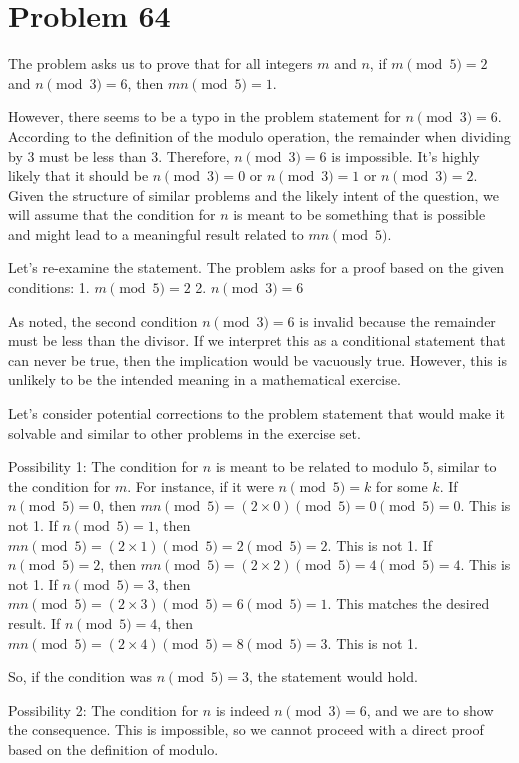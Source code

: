 \documentclass{article}
\begin{document}
\newpage

\section*{Problem 64}
The problem asks us to prove that for all integers $m$ and $n$, if $m \pmod 5 = 2$ and $n \pmod 3 = 6$, then $mn \pmod 5 = 1$.

However, there seems to be a typo in the problem statement for $n \pmod 3 = 6$. According to the definition of the modulo operation, the remainder when dividing by 3 must be less than 3. Therefore, $n \pmod 3 = 6$ is impossible. It's highly likely that it should be $n \pmod 3 = 0$ or $n \pmod 3 = 1$ or $n \pmod 3 = 2$. Given the structure of similar problems and the likely intent of the question, we will assume that the condition for $n$ is meant to be something that is possible and might lead to a meaningful result related to $mn \pmod 5$.

Let's re-examine the statement. The problem asks for a proof based on the given conditions:
1. $m \pmod 5 = 2$
2. $n \pmod 3 = 6$

As noted, the second condition $n \pmod 3 = 6$ is invalid because the remainder must be less than the divisor. If we interpret this as a conditional statement that can never be true, then the implication would be vacuously true. However, this is unlikely to be the intended meaning in a mathematical exercise.

Let's consider potential corrections to the problem statement that would make it solvable and similar to other problems in the exercise set.

Possibility 1: The condition for $n$ is meant to be related to modulo 5, similar to the condition for $m$. For instance, if it were $n \pmod 5 = k$ for some $k$.
If $n \pmod 5 = 0$, then $mn \pmod 5 = (2 \times 0) \pmod 5 = 0 \pmod 5 = 0$. This is not 1.
If $n \pmod 5 = 1$, then $mn \pmod 5 = (2 \times 1) \pmod 5 = 2 \pmod 5 = 2$. This is not 1.
If $n \pmod 5 = 2$, then $mn \pmod 5 = (2 \times 2) \pmod 5 = 4 \pmod 5 = 4$. This is not 1.
If $n \pmod 5 = 3$, then $mn \pmod 5 = (2 \times 3) \pmod 5 = 6 \pmod 5 = 1$. This matches the desired result.
If $n \pmod 5 = 4$, then $mn \pmod 5 = (2 \times 4) \pmod 5 = 8 \pmod 5 = 3$. This is not 1.

So, if the condition was $n \pmod 5 = 3$, the statement would hold.

Possibility 2: The condition for $n$ is indeed $n \pmod 3 = 6$, and we are to show the consequence. This is impossible, so we cannot proceed with a direct proof based on the definition of modulo.
\end{document}
